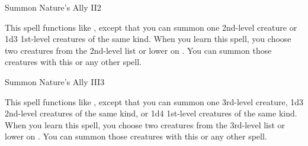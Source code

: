 \begin{spellsection}{Summon Nature's Ally II}{2}
\begin{spellheader}
\end{spellheader}
\begin{spellcontent}
    \spelleffect This spell functions like , except that you can summon one 2nd-level creature or 1d3 1st-level creatures of the same kind. When you learn this spell, you choose two creatures from the 2nd-level list or lower on . You can summon those creatures with this or any other  spell.
    \spelldur \durshort \dismissable
\end{spellcontent}
\begin{spellfooter}
\end{spellfooter}
\end{spellsection}

\begin{spellsection}{Summon Nature's Ally III}{3}
\begin{spellheader}
\end{spellheader}
\begin{spellcontent}
    \spelleffect This spell functions like , except that you can summon one 3rd-level creature, 1d3 2nd-level creatures of the same kind, or 1d4 1st-level creatures of the same kind. When you learn this spell, you choose two creatures from the 3rd-level list or lower on . You can summon those creatures with this or any other  spell.
    \spelldur \durshort \dismissable
\end{spellcontent}
\begin{spellfooter}
\end{spellfooter}
\end{spellsection}

